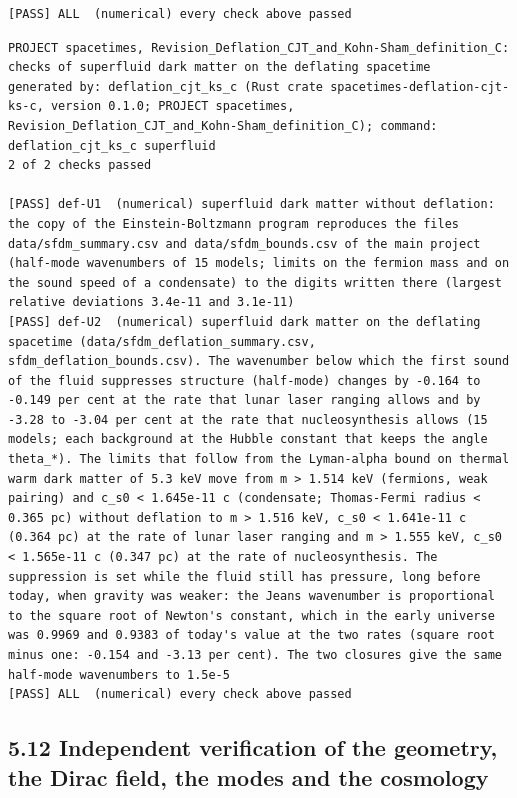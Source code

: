 \documentclass[
  10pt,
]{article}
\begin{document}
\begin{verbatim}
[PASS] ALL  (numerical) every check above passed
\end{verbatim}

\begin{verbatim}
PROJECT spacetimes, Revision_Deflation_CJT_and_Kohn-Sham_definition_C: checks of superfluid dark matter on the deflating spacetime
generated by: deflation_cjt_ks_c (Rust crate spacetimes-deflation-cjt-ks-c, version 0.1.0; PROJECT spacetimes, Revision_Deflation_CJT_and_Kohn-Sham_definition_C); command: deflation_cjt_ks_c superfluid
2 of 2 checks passed

[PASS] def-U1  (numerical) superfluid dark matter without deflation: the copy of the Einstein-Boltzmann program reproduces the files data/sfdm_summary.csv and data/sfdm_bounds.csv of the main project (half-mode wavenumbers of 15 models; limits on the fermion mass and on the sound speed of a condensate) to the digits written there (largest relative deviations 3.4e-11 and 3.1e-11)
[PASS] def-U2  (numerical) superfluid dark matter on the deflating spacetime (data/sfdm_deflation_summary.csv, sfdm_deflation_bounds.csv). The wavenumber below which the first sound of the fluid suppresses structure (half-mode) changes by -0.164 to -0.149 per cent at the rate that lunar laser ranging allows and by -3.28 to -3.04 per cent at the rate that nucleosynthesis allows (15 models; each background at the Hubble constant that keeps the angle theta_*). The limits that follow from the Lyman-alpha bound on thermal warm dark matter of 5.3 keV move from m > 1.514 keV (fermions, weak pairing) and c_s0 < 1.645e-11 c (condensate; Thomas-Fermi radius < 0.365 pc) without deflation to m > 1.516 keV, c_s0 < 1.641e-11 c (0.364 pc) at the rate of lunar laser ranging and m > 1.555 keV, c_s0 < 1.565e-11 c (0.347 pc) at the rate of nucleosynthesis. The suppression is set while the fluid still has pressure, long before today, when gravity was weaker: the Jeans wavenumber is proportional to the square root of Newton's constant, which in the early universe was 0.9969 and 0.9383 of today's value at the two rates (square root minus one: -0.154 and -3.13 per cent). The two closures give the same half-mode wavenumbers to 1.5e-5
[PASS] ALL  (numerical) every check above passed
\end{verbatim}

\hypertarget{independent-verification-of-the-geometry-the-dirac-field-the-modes-and-the-cosmology}{%
\subsection{5.12 Independent verification of the geometry, the Dirac
field, the modes and the
cosmology}\label{independent-verification-of-the-geometry-the-dirac-field-the-modes-and-the-cosmology}}
\end{document}
